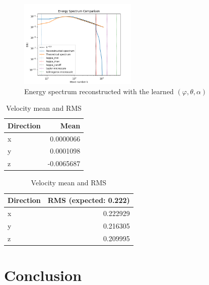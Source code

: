\documentclass[11pt]{beamer}
\begin{document}
\begin{frame}
  \begin{figure}
    \centering
    \includegraphics[width=0.5\textwidth]{illustrations/EnerSpectAnglesRMS.png}
    \caption{Energy spectrum reconstructed with the learned $(\varphi,\theta,\alpha)$}
  \end{figure}

   \begin{table}
    \centering
    \begin{tabular}{lr}
      \toprule
      \textbf{Direction} & \textbf{Mean} \\
      \midrule
      x & 0.0000066 \\
      y & 0.0001098\\
      z & -0.0065687 \\
      \bottomrule
    \end{tabular}
    \qquad
    \begin{tabular}{lr}
      \toprule
      \textbf{Direction} & \textbf{RMS (expected: 0.222)} \\
      \midrule
      x & 0.222929 \\
      y & 0.216305 \\
      z & 0.209995 \\
      \bottomrule
    \end{tabular}
    \caption{Velocity mean and RMS}
  \end{table}
\end{frame}




\section{Conclusion}
\end{document}
